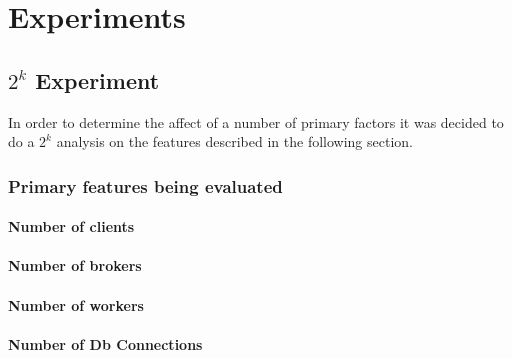 \documentclass[milestone1.tex]{subfiles}
\begin{document}
\section{Experiments}




\subsection{$2^k$ Experiment}
In order to determine the affect of a number of primary factors it was decided to do a $2^k$ analysis on the features described in the following section.

\subsubsection{Primary features being evaluated}

\paragraph{Number of clients}

\paragraph{Number of brokers}

\paragraph{Number of workers}

\paragraph{Number of Db Connections}
\end{document}
